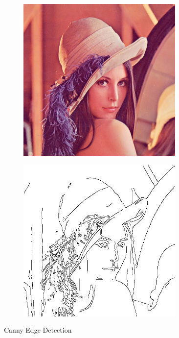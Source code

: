 \documentclass[a4paper,bibliography=totocnumbered,parskip,headsepline]{scrbook}
\begin{document}
\begin{figure}
\begin{subfigure}{0.5\textwidth}
    \centering
    \includegraphics[width=0.9\textwidth]{images/benchmarks/canny/lena}
\end{subfigure}
\begin{subfigure}{0.5\textwidth}
    \centering
    \includegraphics[width=0.9\textwidth]{images/benchmarks/canny/lena-edges}
\end{subfigure}
\caption{Canny Edge Detection}
\label{fig:lena}
\end{figure}
\end{document}
